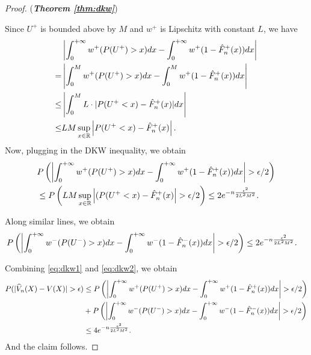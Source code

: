 \begin{proof}(\textbf{\textit{Theorem \ref{thm:dkw}}})

Since $U^+$ is bounded above by $M$ and $w^+$ is Lipschitz with constant $L$, we have
\begin{align*}
&\left|\int_0^{+\infty} w^+(P(U^+)>x) dx- \int_0^{+\infty} w^+(1- {\hat F_n}^+(x)) dx\right|
\\
= & \left|\int_0^M w^+(P(U^+)>x) dx- \int_0^M w^+(1- {\hat F_n}^+(x)) dx\right|
\\
\leq&
\left|\int_0^M L\cdot |P(U^+<x)-{\hat F_n}^+(x)| dx\right|\\
\leq&
LM\sup_{x\in \mathbb{R}}\left|P(U^+<x)-{\hat F_n}^+(x)\right|.
\end{align*}
Now, plugging in the DKW inequality, we obtain
\begin{align}
&
P\left(\left|\intinfinity w^+(P(U^+)>x) dx- \intinfinity w^+(1- {\hat F_n}^+(x)) dx\right|>\epsilon/2\right)
\nonumber\\
&
\leq
 P\left(LM\sup_{x\in \mathbb{R}} \left|(P(U^+<x)-{\hat F_n}^+(x)\right|>\epsilon/2\right) \leq 2 e^{-n \frac{\epsilon^2}{2 L^2 M^2}}.\label{eq:dkw1}
\end{align}

Along similar lines, we obtain
\begin{align}
&
P\left(\left|\intinfinity w^-(P(U^-)>x) dx- \intinfinity w^-(1- {\hat F_n}^-(x)) dx\right|>\epsilon/2\right)
 \leq 2 e^{-n \frac{\epsilon^2}{2 L^2 M^2}}.\label{eq:dkw2}
\end{align}

Combining \eqref{eq:dkw1} and \eqref{eq:dkw2}, we obtain
\begin{align*}
P(|\widehat V_n(X) - V(X)|>\epsilon) 
&\le P\left(\left|\intinfinity w^+(P(U^+)>x) dx- \intinfinity w^+(1- {\hat F_n}^+(x)) dx\right|>\epsilon/2\right) \\
&+ 
P\left(\left|\intinfinity w^-(P(U^-)>x) dx- \intinfinity w^-(1- {\hat F_n}^-(x)) dx\right|>\epsilon/2\right)\\
&\le 4 e^{-n \frac{\epsilon^2}{2 L^2 M^2}}.
\end{align*} 
And the claim follows. 
\end{proof}


